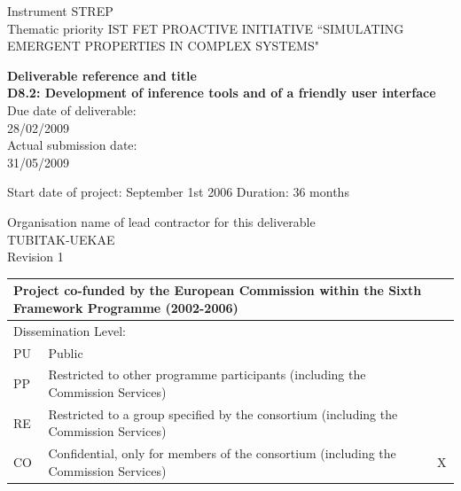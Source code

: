 \documentclass[urop]{socreport}
\begin{document}

\noindent Instrument STREP \\
\small{Thematic priority IST FET PROACTIVE INITIATIVE ``SIMULATING EMERGENT PROPERTIES IN COMPLEX SYSTEMS"}\\
\begin{center}
\textbf{Deliverable reference and title} \\
\small{\textbf{D8.2: Development of inference tools and of a friendly user interface}} \\
Due date of deliverable: \\
28/02/2009 \\ 
Actual submission date: \\
31/05/2009

\vspace{0.1cm}
Start date of project: September 1st 2006 \hfill
Duration: 36 months \\
\end{center}

\noindent \small{Organisation name of lead contractor for this deliverable} \\
TUBITAK-UEKAE\\

\hfill Revision 1 \\

\vspace{0.3cm}
\begin{tabular}{|l|l|c|}
\hline
\multicolumn{3}{|l|}{\small{Project co-funded by the European Commission within the Sixth Framework Programme (2002-2006)}}\\
\hline
\multicolumn{3}{|l|}{Dissemination Level:}\\
\hline
PU & \small{Public} &\\
\hline
PP &\small{Restricted to other programme participants (including the Commission Services)}&   \\
\hline RE & \small{Restricted to a group specified by the consortium (including the Commission Services)}&   \\
\hline CO & \small{Confidential, only for members of the consortium (including the Commission Services)}& X \\
\hline
\end{tabular}
\end{document}

